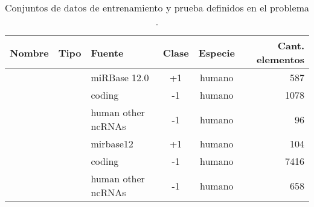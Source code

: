 %
\begin{table}[h]
  \tableStyle
  \begin{tabular}{lllScr}
    \toprule
    Nombre & Tipo & Fuente & {Clase} & Especie & Cant. elementos \\
    \midrule
     & 
    &  miRBase 12.0       & +1    & humano    & 587              \\
    && coding             & -1    & humano    & 1078             \\
    && human other ncRNAs & -1    & humano    & 96               \\
    \midrule
     & 
    &  mirbase12          & +1    & humano    & 104              \\
    && coding             & -1    & humano    & 7416             \\
    && human other ncRNAs & -1    & humano    & 658              \\
    \bottomrule
  \end{tabular}
  \caption{\captionStyle Conjuntos de datos de entrenamiento y prueba
    definidos en el problema .}
  \label{tbl:problembtw}
\end{table}
%
